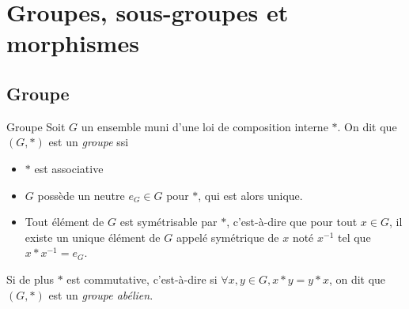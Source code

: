 \section{Groupes, sous-groupes et morphismes}
\subsection{Groupe}

\begin{definition}{Groupe}{}
    Soit $G$ un ensemble muni d'une loi de composition interne $\ast$. 
    On dit que $(G, \ast)$ est un \emph{groupe} ssi 
    \begin{itemize}
        \item $\ast$ est associative
        \item $G$ possède un neutre $e_G \in G$ pour $\ast$, qui est alors unique.
        \item Tout élément de $G$ est symétrisable par $\ast$, c'est-à-dire que pour tout $x \in G$, 
        il existe un unique élément de $G$ appelé symétrique de $x$ noté $x^{-1}$ tel que $x \ast x^{-1} = e_G$.
    \end{itemize}

    Si de plus $\ast$ est commutative, c'est-à-dire si $\forall x, y \in G, x \ast y = y \ast x$, 
    on dit que $(G, \ast)$ est un \emph{groupe abélien}.
\end{definition}

